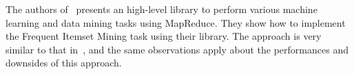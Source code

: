 The authors of~\cite{GhotingKPK11} presents an high-level library to perform
various machine learning and data mining tasks using MapReduce. They show how to
implement the Frequent Itemset Mining task using their library. The approach is
very similar to that in~\cite{LiWZZC08}, and the same observations apply about
the performances and downsides of this approach.

